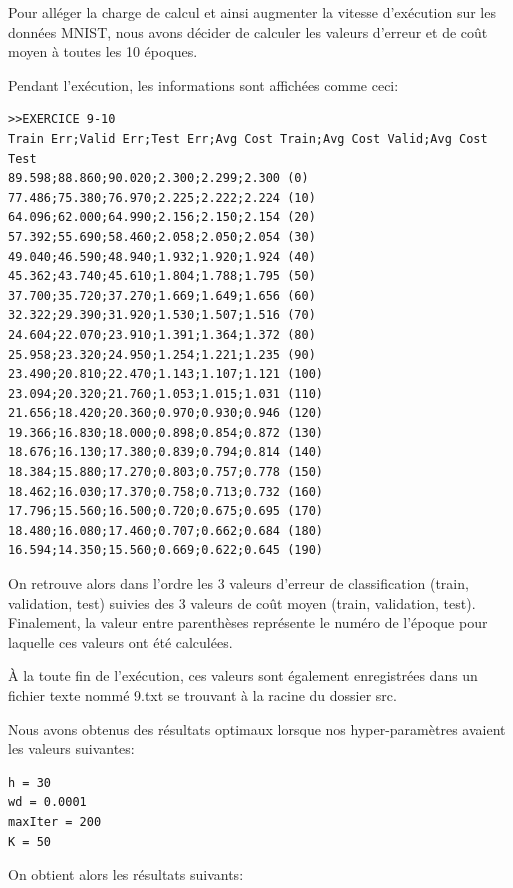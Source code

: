 \documentclass[a4paper,11pt]{article}
\begin{document}
Pour alléger la charge de calcul et ainsi augmenter la vitesse d'exécution sur les données MNIST, nous avons décider de calculer les valeurs d'erreur et de coût moyen à toutes les 10 époques.

Pendant l'exécution, les informations sont affichées comme ceci:

\begin{verbatim}
>>EXERCICE 9-10
Train Err;Valid Err;Test Err;Avg Cost Train;Avg Cost Valid;Avg Cost Test
89.598;88.860;90.020;2.300;2.299;2.300 (0)
77.486;75.380;76.970;2.225;2.222;2.224 (10)
64.096;62.000;64.990;2.156;2.150;2.154 (20)
57.392;55.690;58.460;2.058;2.050;2.054 (30)
49.040;46.590;48.940;1.932;1.920;1.924 (40)
45.362;43.740;45.610;1.804;1.788;1.795 (50)
37.700;35.720;37.270;1.669;1.649;1.656 (60)
32.322;29.390;31.920;1.530;1.507;1.516 (70)
24.604;22.070;23.910;1.391;1.364;1.372 (80)
25.958;23.320;24.950;1.254;1.221;1.235 (90)
23.490;20.810;22.470;1.143;1.107;1.121 (100)
23.094;20.320;21.760;1.053;1.015;1.031 (110)
21.656;18.420;20.360;0.970;0.930;0.946 (120)
19.366;16.830;18.000;0.898;0.854;0.872 (130)
18.676;16.130;17.380;0.839;0.794;0.814 (140)
18.384;15.880;17.270;0.803;0.757;0.778 (150)
18.462;16.030;17.370;0.758;0.713;0.732 (160)
17.796;15.560;16.500;0.720;0.675;0.695 (170)
18.480;16.080;17.460;0.707;0.662;0.684 (180)
16.594;14.350;15.560;0.669;0.622;0.645 (190)
\end{verbatim}

On retrouve alors dans l'ordre les 3 valeurs d'erreur de classification (train, validation, test) suivies des 3 valeurs de coût moyen (train, validation, test). Finalement, la valeur entre parenthèses représente le numéro de l'époque pour laquelle ces valeurs ont été calculées.

À la toute fin de l'exécution, ces valeurs sont également enregistrées dans un fichier texte nommé 9.txt se trouvant à la racine du dossier src.

\newpage

Nous avons obtenus des résultats optimaux lorsque nos hyper-paramètres avaient les valeurs suivantes:

\begin{verbatim}
h = 30
wd = 0.0001
maxIter = 200
K = 50
\end{verbatim}

On obtient alors les résultats suivants:
\end{document}

